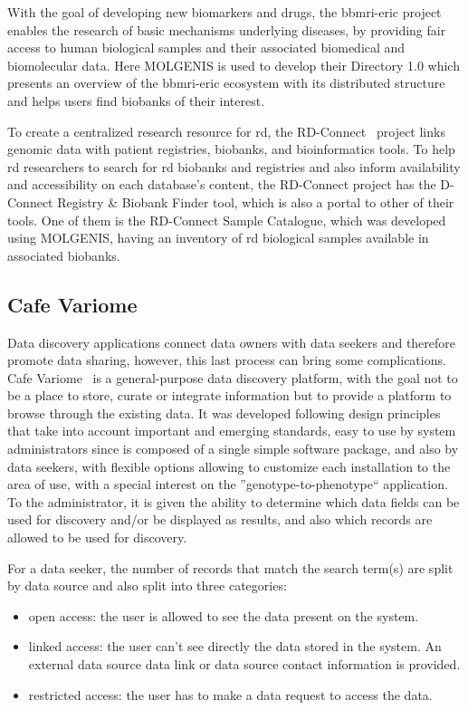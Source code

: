 With the goal of developing new biomarkers and drugs, the \gls{bbmri-eric} project~\cite{bbmrieric} enables the research of basic mechanisms underlying diseases, by providing fair access to human biological samples and their associated biomedical and biomolecular data.
Here MOLGENIS is used to develop their Directory 1.0 which presents an overview of the \gls{bbmri-eric} ecosystem with its distributed structure and helps users find biobanks of their interest.

To create a centralized research resource for \gls{rd}, the RD-Connect~\cite{rdconnect} project links genomic data with patient registries, biobanks, and bioinformatics tools.
To help \gls{rd} researchers to search for \gls{rd} biobanks and registries and also inform availability and accessibility on each database's content, the RD-Connect project has the D-Connect Registry \& Biobank Finder tool, which is also a portal to other of their tools. One of them is the RD-Connect Sample Catalogue, which was developed using MOLGENIS, having an inventory of \gls{rd} biological samples available in associated biobanks.

\subsection*{Cafe Variome}
Data discovery applications connect data owners with data seekers and therefore promote data sharing, however, this last process can bring some complications.
Cafe Variome~\cite{cafevariome} is a general-purpose data discovery platform, with the goal not to be a place to store, curate or integrate information but to provide a platform to browse through the existing data.
It was developed following design principles that take into account important and emerging standards, easy to use by system administrators since is composed of a single simple software package, and also by data seekers, with flexible options allowing to customize each installation to the area of use, with a special interest on the  ''genotype-to-phenotype`` application.
To the administrator, it is given the ability to determine which data fields can be used for discovery and/or be displayed as results, and also which records are allowed to be used for discovery.

For a data seeker, the number of records that match the search term(s) are split by data source and also split into three categories:
\begin{itemize}
    \item open access: the user is allowed to see the data present on the system.
    \item linked access: the user can't see directly the data stored in the system.
        An external data source data link or data source contact information is provided.
    \item restricted access: the user has to make a data request to access the data.
\end{itemize}


